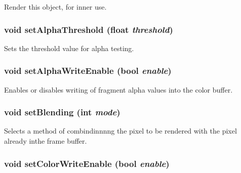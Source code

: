 Render this object, for inner use. \hypertarget{classm3g_1_1CompositingMode_6becafaefd18a2b8b1adeba491576837}{
\subsubsection[{setAlphaThreshold}]{\setlength{\rightskip}{0pt plus 5cm}void setAlphaThreshold (float {\em threshold})}}
\label{classm3g_1_1CompositingMode_6becafaefd18a2b8b1adeba491576837}


Sets the threshold value for alpha testing. \hypertarget{classm3g_1_1CompositingMode_5204f1acac056f82d322262703be67b0}{
\subsubsection[{setAlphaWriteEnable}]{\setlength{\rightskip}{0pt plus 5cm}void setAlphaWriteEnable (bool {\em enable})}}
\label{classm3g_1_1CompositingMode_5204f1acac056f82d322262703be67b0}


Enables or disables writing of fragment alpha values into the color buffer. \hypertarget{classm3g_1_1CompositingMode_4c09465dfec9efa000c115c5c2867b63}{
\subsubsection[{setBlending}]{\setlength{\rightskip}{0pt plus 5cm}void setBlending (int {\em mode})}}
\label{classm3g_1_1CompositingMode_4c09465dfec9efa000c115c5c2867b63}


Selects a method of combindinnnng the pixel to be rendered with the pixel already inthe frame buffer. \hypertarget{classm3g_1_1CompositingMode_84f7cba08f5a2bea05de4fc3154a50b2}{
\subsubsection[{setColorWriteEnable}]{\setlength{\rightskip}{0pt plus 5cm}void setColorWriteEnable (bool {\em enable})}}
\label{classm3g_1_1CompositingMode_84f7cba08f5a2bea05de4fc3154a50b2}


